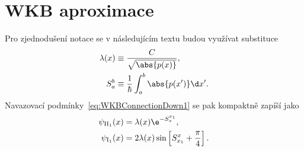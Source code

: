 \section{WKB aproximace}

\begin{theory}
	
	
	
        
    \begin{note}[Značení:]
        Pro zjednodušení notace se v následujícím textu budou využívat substituce
		\begin{subequations}
			\begin{align}
				\lambda(x)&\equiv\frac{C}{\sqrt{\abs{p(x)}}},\\
				S_{a}^{b}&\equiv\frac{1}{\hbar}\int_{a}^{b}\abs{p(x')}\d x'.
				\label{eq:WKBNotation}
			\end{align}					
		\end{subequations}
        Navazovací podmínky~\eqref{eq:WKBConnectionDown1} se pak kompaktně zapíší jako
		\begin{subequations}
			\begin{align}
				\psi_{\mathrm{II}_{1}}(x)&=\lambda(x)\e^{-S_{x}^{x_{1}}},\\
				\psi_{\mathrm{I}_{1}}(x)&=2\lambda(x)\sin\left[S_{x_{1}}^{x}+\frac{\pi}{4}\right].
			\end{align}				
		\end{subequations}
    \end{note}
\end{theory}



	



